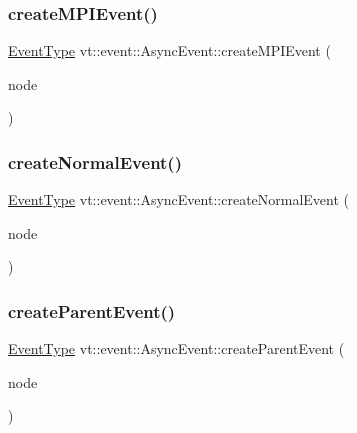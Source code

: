 \mbox{\label{structvt_1_1event_1_1_async_event_ae94bb2059c35857a228fd55ab5512272}} 
\subsubsection{\texorpdfstring{create\+M\+P\+I\+Event()}{createMPIEvent()}}
{\footnotesize\ttfamily \hyperlink{namespacevt_a009267401def7ae8bf201892222d060f}{Event\+Type} vt\+::event\+::\+Async\+Event\+::create\+M\+P\+I\+Event (\begin{DoxyParamCaption}\item[{\hyperlink{namespacevt_a866da9d0efc19c0a1ce79e9e492f47e2}{Node\+Type} const \&}]{node }\end{DoxyParamCaption})}

\mbox{\label{structvt_1_1event_1_1_async_event_aa7c07c129ba54bde5abbe95c543ca352}} 
\subsubsection{\texorpdfstring{create\+Normal\+Event()}{createNormalEvent()}}
{\footnotesize\ttfamily \hyperlink{namespacevt_a009267401def7ae8bf201892222d060f}{Event\+Type} vt\+::event\+::\+Async\+Event\+::create\+Normal\+Event (\begin{DoxyParamCaption}\item[{\hyperlink{namespacevt_a866da9d0efc19c0a1ce79e9e492f47e2}{Node\+Type} const \&}]{node }\end{DoxyParamCaption})}

\mbox{\label{structvt_1_1event_1_1_async_event_a9646f211d660d2e991df07b77e5f2cc6}} 
\subsubsection{\texorpdfstring{create\+Parent\+Event()}{createParentEvent()}}
{\footnotesize\ttfamily \hyperlink{namespacevt_a009267401def7ae8bf201892222d060f}{Event\+Type} vt\+::event\+::\+Async\+Event\+::create\+Parent\+Event (\begin{DoxyParamCaption}\item[{\hyperlink{namespacevt_a866da9d0efc19c0a1ce79e9e492f47e2}{Node\+Type} const \&}]{node }\end{DoxyParamCaption})}

